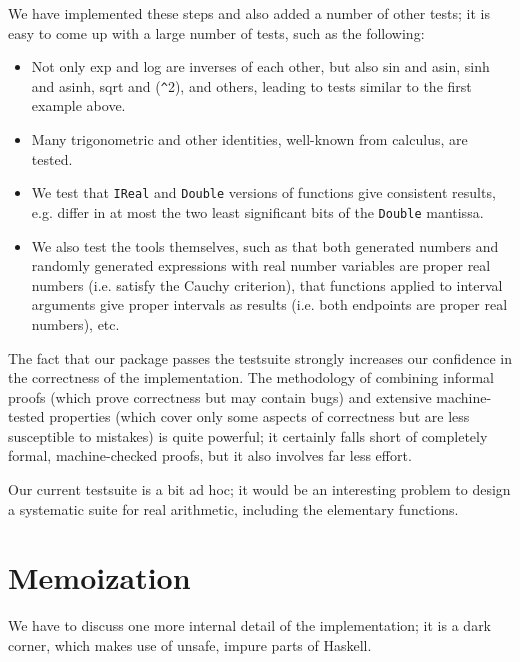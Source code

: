 \documentclass[9pt, a4, twocolumn]{article}
\begin{document}
We have implemented these steps and also added a number of other
tests; it is easy to come up with a large number of tests, such as the following:
\begin{itemize}
\item Not only exp and log are inverses of each other, but also sin and
  asin, sinh and asinh, sqrt and (\texttt{\^}2), and others, leading to tests
  similar to the first example above. 
\item Many trigonometric and other  identities, well-known from
  calculus, are tested.
\item We test that \texttt{IReal} and \texttt{Double} versions of
  functions give consistent results, e.g. differ in at most the two least
  significant bits of the \texttt{Double} mantissa.
\item We also test the tools themselves, such as that both generated
  numbers and randomly generated expressions with real number variables
  are proper real numbers (i.e. satisfy the Cauchy criterion), that
  functions applied to interval arguments give proper intervals as
  results (i.e. both endpoints are proper real numbers), etc.
\end{itemize}
The fact that our package passes the testsuite strongly increases our
confidence in the correctness of the implementation. The methodology
of combining informal proofs (which prove correctness but may contain
bugs) and extensive machine-tested properties (which cover only some
aspects of correctness but are less susceptible to mistakes) is quite
powerful; it certainly falls short of completely formal,
machine-checked proofs, but it also involves far less effort. 

Our current testsuite is a bit ad hoc; it would be an interesting
problem to design a systematic suite for real arithmetic, including
the elementary functions.

\section{Memoization}

We have to discuss one more internal detail of the implementation; it
is a dark corner, which makes use of unsafe, impure parts of Haskell.
\end{document}
